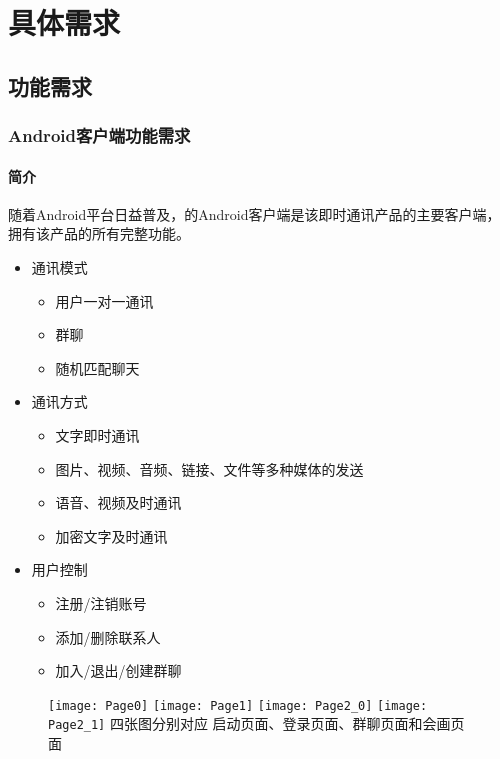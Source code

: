 \chapter{具体需求}
\iffalse
<The following sections must be repeated for each requirement. >

在每一条需求描述中重复下列部分
\fi
\section{功能需求}
\iffalse
This section describes how the input of the software is translated to the output. It describes the essential action the software must perform.

For each kind of function, or each independent function in some cases, the requirements of input, process and output must be described, which are usually organized with the following four subsections:

本子章节应描述软件产品的输入怎样被转换成输出。它描述了软件必须执行的基本动作。 

对每一类功能或有时对每一个单独的功能，必须描述输入、处理、输出方面的需求。这些通常以下面四个子段落来组织：
\fi
\subsection{Android客户端功能需求}
\subsubsection{简介}
随着Android平台日益普及，的Android客户端是该即时通讯产品的主要客户端，拥有该产品的所有完整功能。
\begin{itemize}
\item 通讯模式
  \begin{itemize}  	
  	\item 用户一对一通讯
  	\item 群聊
  	\item 随机匹配聊天
  \end{itemize}
\item 通讯方式
  \begin{itemize}
  	\item 文字即时通讯
  	\item 图片、视频、音频、链接、文件等多种媒体的发送
  	\item 语音、视频及时通讯
  	\item 加密文字及时通讯
  \end{itemize}
\item 用户控制
  \begin{itemize}
  	\item 注册/注销账号
  	\item 添加/删除联系人
  	\item 加入/退出/创建群聊
  \end{itemize}
\end{itemize}
  \begin{figure}[!h]
	\texttt{[image: Page0]}
	\texttt{[image: Page1]}
	\texttt{[image: Page2\_0]}
	\texttt{[image: Page2\_1]}
	四张图分别对应 启动页面、登录页面、群聊页面和会画页面
	\label{fig:noted-figure}
\end{figure}
